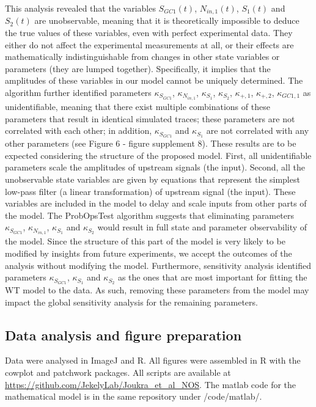 \documentclass[
  11pt,
  letterpaper,
  DIV=11,
  numbers=noendperiod]{scrartcl}
\begin{document}
This analysis revealed that the variables \(S_{GC1}(t)\),
\(N_{in,1}(t)\), \(S_1(t)\) and \(S_2(t)\) are unobservable, meaning
that it is theoretically impossible to deduce the true values of these
variables, even with perfect experimental data. They either do not
affect the experimental measurements at all, or their effects are
mathematically indistinguishable from changes in other state variables
or parameters (they are lumped together). Specifically, it implies that
the amplitudes of these variables in our model cannot be uniquely
determined. The algorithm further identified parameters
\(\kappa_{S_{GC1}}\), \(\kappa_{N_{in,1}}\), \(\kappa_{S_1}\),
\(\kappa_{S_2}\), \(\kappa_{+,1}\), \(\kappa_{+,2}\), \(\kappa_{GC1,1}\)
as unidentifiable, meaning that there exist multiple combinations of
these parameters that result in identical simulated traces; these
parameters are not correlated with each other; in addition,
\(\kappa_{S_{GC1}}\) and \(\kappa_{S_1}\) are not correlated with any
other parameters (see Figure 6 - figure supplement 8). These results are
to be expected considering the structure of the proposed model. First,
all unidentifiable parameters scale the amplitudes of upstream signals
(the input). Second, all the unobservable state variables are given by
equations that represent the simplest low-pass filter (a linear
transformation) of upstream signal (the input). These variables are
included in the model to delay and scale inputs from other parts of the
model. The ProbOpsTest algorithm suggests that eliminating parameters
\(\kappa_{S_{GC1}}\), \(\kappa_{N_{in,1}}\), \(\kappa_{S_1}\) and
\(\kappa_{S_2}\) would result in full state and parameter observability
of the model. Since the structure of this part of the model is very
likely to be modified by insights from future experiments, we accept the
outcomes of the analysis without modifying the model. Furthermore,
sensitivity analysis identified parameters \(\kappa_{S_{GC1}}\),
\(\kappa_{S_1}\) and \(\kappa_{S_2}\) as the ones that are most
important for fitting the WT model to the data. As such, removing these
parameters from the model may impact the global sensitivity analysis for
the remaining parameters.

\subsection{Data analysis and figure
preparation}\label{data-analysis-and-figure-preparation}

Data were analysed in ImageJ and R. All figures were assembled in R with
the cowplot and patchwork packages. All scripts are available at
\url{https://github.com/JekelyLab/Joukra_et_al_NOS}. The matlab code for
the mathematical model is in the same repository under /code/matlab/.
\end{document}
